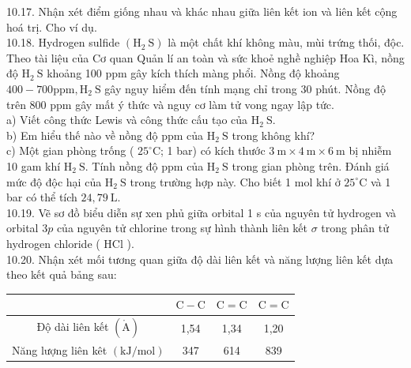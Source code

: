\documentclass[10pt]{article}
\def\AA{\mathring{\mathrm{A}}}
\begin{document}
10.17. Nhận xét điểm giống nhau và khác nhau giữa liên kết ion và liên kết cộng hoá trị. Cho ví dụ.\\
10.18. Hydrogen sulfide $\left(\mathrm{H}_{2} \mathrm{~S}\right)$ là một chất khí không màu, mùi trứng thối, độc. Theo tài liệu của Cơ quan Quản lí an toàn và sức khoẻ nghề nghiệp Hoa Kì, nồng độ $\mathrm{H}_{2} \mathrm{~S}$ khoảng 100 ppm gây kích thích màng phổi. Nồng độ khoảng $400-700 \mathrm{ppm}, \mathrm{H}_{2} \mathrm{~S}$ gây nguy hiểm đến tính mạng chỉ trong 30 phút. Nồng độ trên 800 ppm gây mất ý thức và nguy cơ làm tử vong ngay lập tức.\\
a) Viết công thức Lewis và công thức cấu tạo của $\mathrm{H}_{2} \mathrm{~S}$.\\
b) Em hiểu thế nào về nồng độ ppm của $\mathrm{H}_{2} \mathrm{~S}$ trong không khí?\\
c) Một gian phòng trống ( $25^{\circ} \mathrm{C}$; 1 bar) có kích thước $3 \mathrm{~m} \times 4 \mathrm{~m} \times 6 \mathrm{~m}$ bị nhiễm 10 gam khí $\mathrm{H}_{2} \mathrm{~S}$. Tính nồng độ ppm của $\mathrm{H}_{2} \mathrm{~S}$ trong gian phòng trên. Đánh giá mức độ độc hại của $\mathrm{H}_{2} \mathrm{~S}$ trong trường hợp này. Cho biết 1 mol khí ở $25^{\circ} \mathrm{C}$ và 1 bar có thể tích $24,79 \mathrm{~L}$.\\
10.19. Vẽ sơ đồ biểu diễn sự xen phủ giữa orbital 1 s của nguyên tử hydrogen và orbital $3 p$ của nguyên tử chlorine trong sự hình thành liên kết $\sigma$ trong phân tử hydrogen chloride ( HCl ).\\
10.20. Nhận xét mối tương quan giữa độ dài liên kết và năng lượng liên kết dựa theo kết quả bảng sau:

\begin{center}
\begin{tabular}{|c|c|c|c|}
\hline
 & $\mathrm{C}-\mathrm{C}$ & $\mathrm{C}=\mathrm{C}$ & $\mathrm{C}=\mathrm{C}$ \\
\hline
Độ dài liên kết $(\AA)$ & 1,54 & 1,34 & 1,20 \\
\hline
Năng lượng liên kêt $(\mathrm{kJ} / \mathrm{mol})$ & 347 & 614 & 839 \\
\hline
\end{tabular}
\end{center}
\end{document}
